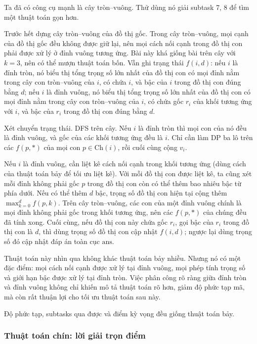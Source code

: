 \documentclass[11pt]{article}
\begin{document}
Ta đã có công cụ mạnh là cây tròn--vuông. Thử dùng nó giải subtask 7, 8 để
tìm một thuật toán gọn hơn.

Trước hết dựng cây tròn--vuông của đồ thị gốc. Trong cây tròn--vuông, mọi cạnh
của đồ thị gốc đều không được giữ lại, nên mọi cách nối cạnh trong đồ thị con
phải được xử lý ở đỉnh vuông tương ứng. Bài này khá giống bài trên cây với
\(k=3\), nên có thể mượn thuật toán bốn. Vẫn ghi trạng thái \(f(i,d)\): nếu
\(i\) là đỉnh tròn, nó biểu thị tổng trọng số lớn nhất của đồ thị con có mọi
đỉnh nằm trong cây con tròn--vuông của \(i\), có chứa \(i\), và bậc của \(i\)
trong đồ thị con đúng bằng \(d\); nếu \(i\) là đỉnh vuông, nó biểu thị tổng
trọng số lớn nhất của đồ thị con có mọi đỉnh nằm trong cây con tròn--vuông của
\(i\), có chứa gốc \(r_i\) của khối tương ứng với \(i\), và bậc của \(r_i\)
trong đồ thị con đúng bằng \(d\).

Xét chuyển trạng thái. DFS trên cây. Nếu \(i\) là đỉnh tròn thì mọi con của
nó đều là đỉnh vuông, và gốc của các khối tương ứng đều là \(i\). Chỉ cần làm
DP ba lô trên các \(f(p,*)\) của mọi con \(p\in\mathrm{Ch}(i)\), rồi cuối cùng
cộng \(v_i\).

Nếu \(i\) là đỉnh vuông, cần liệt kê cách nối cạnh trong khối tương ứng (dùng
cách của thuật toán bảy để tối ưu liệt kê). Với mỗi đồ thị con được liệt kê,
ta cũng xét mỗi đỉnh không phải gốc \(p\) trong đồ thị con còn có thể thêm bao
nhiêu bậc từ phía dưới. Nếu có thể thêm \(d\) bậc, trọng số đồ thị con hiện tại
cộng thêm \(\max_{k=0}^{d}f(p,k)\). Trên cây tròn--vuông, các con của một
đỉnh vuông chính là mọi đỉnh không phải gốc trong khối tương ứng, nên các
\(f(p,*)\) của chúng đều đã tính xong. Cuối cùng, nếu đồ thị con này chứa gốc
\(r_i\), gọi bậc của \(r_i\) trong đồ thị con là \(d\), thì dùng trọng số đồ
thị con cập nhật \(f(i,d)\); ngược lại dùng trọng số đó cập nhật đáp án toàn
cục \(\mathrm{ans}\).

Thuật toán này nhìn qua không khác thuật toán bảy nhiều. Nhưng nó có một đặc
điểm: mọi cách nối cạnh được xử lý tại đỉnh vuông, mọi phép tính trọng số và
giới hạn bậc được xử lý tại đỉnh tròn. Việc phân công rõ ràng giữa đỉnh tròn
và đỉnh vuông không chỉ khiến mô tả thuật toán rõ hơn, giảm độ phức tạp mã,
mà còn rất thuận lợi cho tối ưu thuật toán sau này.

Độ phức tạp, subtasks qua được và điểm kỳ vọng đều giống thuật toán bảy.

\subsubsection{Thuật toán chín: lời giải trọn điểm}
\end{document}

